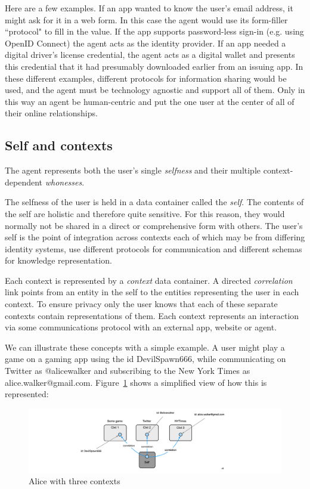 \documentclass[11pt, oneside]{article}   	%
\begin{document}
Here are a few examples. If an app wanted to know the user's email address, it might ask for it in a web form. In this case the agent would use its form-filler ``protocol" to fill in the value. If the app supports password-less sign-in (e.g. using OpenID Connect) the agent acts as the identity provider. If an app needed a digital driver's license credential, the agent acts as a digital wallet and presents this credential that it had presumably downloaded earlier from an issuing app. In these different examples, different protocols for information sharing would be used, and the agent must be technology agnostic and support all of them. Only in this way an agent be human-centric and put the one user at the center of all of their online relationships.

\subsection{Self and contexts}
The agent represents both the user's single \emph{selfness} and their multiple context-dependent \emph{whonesses}.

The selfness of the user is held in a data container called the \emph{self}. The contents of the self are holistic and therefore quite sensitive. For this reason, they would normally not be shared in a direct or comprehensive form with others. The user's self is the point of integration across contexts each of which may be from differing identity systems, use different protocols for communication and different schemas for knowledge representation.

Each context is represented by a \emph{context} data container. A directed \emph{correlation} link points from an entity in the self to the entities representing the user in each context. To ensure privacy only the user knows that each of these separate contexts contain representations of them. Each context represents an interaction via some communications protocol with an external app, website or agent. 

We can illustrate these concepts with a simple example. A user might play a game on a gaming app using the id DevilSpawn666, while communicating on Twitter as @alicewalker and subscribing to the New York Times as alice.walker@gmail.com. Figure~\ref{fig:three-contexts} shows a simplified view of how this is represented:

\begin{figure}[htbp]
\includegraphics[width=\textwidth]{./images/example1.png}
\caption{Alice with three contexts}
\label{fig:three-contexts}
\end{figure}
\end{document}
